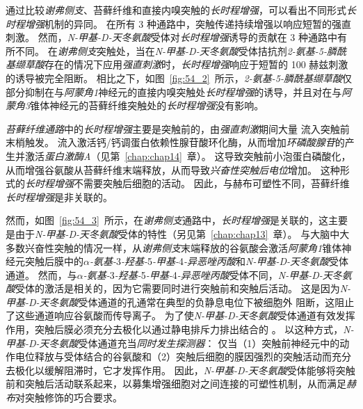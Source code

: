 通过比较\textit{谢弗侧支}、苔藓纤维和直接内嗅突触的\textit{长时程增强}，可以看出不同形式\textit{长时程增强}机制的异同。
在所有 3 种通路中，突触传递持续增强以响应短暂的强直刺激。
然而，\textit{N-甲基-D-天冬氨酸}受体对\textit{长时程增强}诱导的贡献在 3 种通路中有所不同。
在\textit{谢弗侧支}突触处，当在\textit{N-甲基-D-天冬氨酸}受体拮抗剂\textit{2-氨基-5-膦酰基缬草酸}存在的情况下应用\textit{强直刺激}时，\textit{长时程增强}响应于短暂的 100 赫兹刺激的诱导被完全阻断。
相比之下，如图~\ref{fig:54_2}~所示，\textit{2-氨基-5-膦酰基缬草酸}仅部分抑制在与\textit{阿蒙角1}神经元的直接内嗅突触处\textit{长时程增强}的诱导，并且对在与\textit{阿蒙角3}锥体神经元的苔藓纤维突触处的\textit{长时程增强}没有影响。


\textit{苔藓纤维通路}中的\textit{长时程增强}主要是突触前的，由\textit{强直刺激}期间大量  流入突触前末梢触发。
 流入激活钙/钙调蛋白依赖性腺苷酸环化酶，从而增加\textit{环磷酸腺苷}的产生并激活\textit{蛋白激酶A}（见第~\ref{chap:chap14}~章）。
这导致突触前小泡蛋白磷酸化，从而增强谷氨酸从苔藓纤维末端释放，从而导致\textit{兴奋性突触后电位}增加。
这种形式的\textit{长时程增强}不需要突触后细胞的活动。
因此，与赫布可塑性不同，苔藓纤维\textit{长时程增强}是非关联的。


然而，如图~\ref{fig:54_3}~所示，在\textit{谢弗侧支}通路中，\textit{长时程增强}是关联的，这主要是由于\textit{N-甲基-D-天冬氨酸}受体的特性（另见第~\ref{chap:chap13}~章）。
与大脑中大多数兴奋性突触的情况一样，从\textit{谢弗侧支}末端释放的谷氨酸会激活\textit{阿蒙角1}锥体神经元突触后膜中的\textit{$\alpha$-氨基-}3\textit{-羟基-}5\textit{-甲基-}4\textit{-异恶唑丙酸}和\textit{N-甲基-D-天冬氨酸}受体通道。
然而，与\textit{$\alpha$-氨基-}3\textit{-羟基-}5\textit{-甲基-}4\textit{-异恶唑丙酸}受体不同，\textit{N-甲基-D-天冬氨酸}受体的激活是相关的，因为它需要同时进行突触前和突触后活动。
这是因为\textit{N-甲基-D-天冬氨酸}受体通道的孔通常在典型的负静息电位下被细胞外  阻断，这阻止了这些通道响应谷氨酸而传导离子。
为了使\textit{N-甲基-D-天冬氨酸}受体通道有效发挥作用，突触后膜必须充分去极化以通过静电排斥力排出结合的 。
以这种方式，\textit{N-甲基-D-天冬氨酸}受体通道充当\textit{同时发生探测器}：
仅当（1）突触前神经元中的动作电位释放与受体结合的谷氨酸和（2）突触后细胞的膜因强烈的突触活动而充分去极化以缓解阻滞时，它才发挥作用。
因此，\textit{N-甲基-D-天冬氨酸}受体能够将突触前和突触后活动联系起来，以募集增强细胞对之间连接的可塑性机制，从而满足\textit{赫布}对突触修饰的巧合要求。



